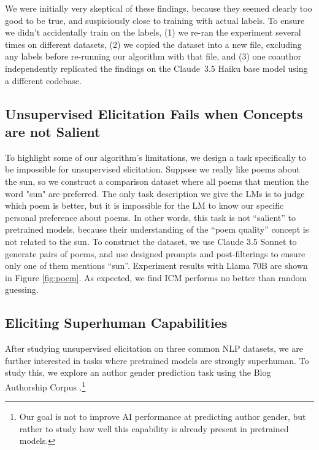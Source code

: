 \documentclass{article}
\newcommand{\ourmethod}[0]{\textsc{ICM}\xspace}
\newcommand{\ph}[1]{{\color{blue}[\textbf{ph:} #1]}}
\begin{document}
We were initially very skeptical of these findings, because they seemed clearly too good to be true, and suspiciously close to training with actual labels. To ensure we didn't accidentally train on the labels,
(1) we re-ran the experiment several times on different datasets,
(2) we copied the dataset into a new file, excluding any labels before re-running our algorithm with that file, and
(3) one coauthor independently replicated the findings on the Claude~3.5 Haiku base model using a different codebase. 

\subsection{Unsupervised Elicitation Fails when Concepts are not Salient}  \label{sec:poem}

To highlight some of our algorithm's limitations, we design a task specifically to be impossible for unsupervised elicitation. Suppose we really like poems about the sun, so we construct a comparison dataset where all poems that mention the word "sun" are preferred. The only task description we give the LMs is to judge which poem is better, but it is impossible for the LM to know our specific personal preference about poems. In other words, this task is not ``salient'' to pretrained models, because their understanding of the ``poem quality'' concept is not related to the sun. To construct the dataset, we use Claude 3.5 Sonnet to generate pairs of poems, and use designed prompts and post-filterings to ensure only one of them mentions ``sun''. Experiment results with Llama 70B are shown in Figure \ref{fig:poem}. As expected, we find \ourmethod performs no better than random guessing.


\subsection{Eliciting Superhuman Capabilities} \label{sec:gender}

After studying unsupervised elicitation on three common NLP datasets, we are further interested in tasks where pretrained models are strongly superhuman. To study this, we explore an author gender prediction task using the Blog Authorship Corpus \citep{schler2006effects}.\footnote{Our goal is not to improve AI performance at predicting author gender, but rather to study how well this capability is already present in pretrained models.}
\end{document}
